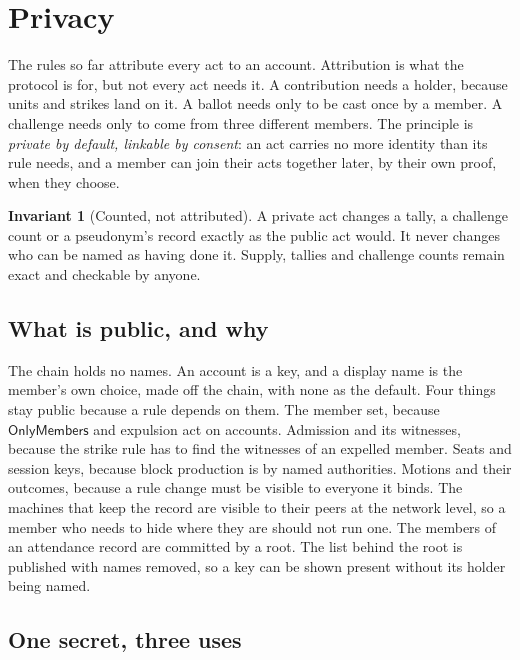 \documentclass[11pt,a4paper]{article}
\theoremstyle{definition}
\newtheorem{invariant}{Invariant}[section]
\theoremstyle{plain}
\theoremstyle{remark}
\begin{document}
\section{Privacy}
\label{sec:privacy}

The rules so far attribute every act to an account. Attribution is what the protocol is for, but not every act needs it. A contribution needs a holder, because units and strikes land on it. A ballot needs only to be cast once by a member. A challenge needs only to come from three different members. The principle is \emph{private by default, linkable by consent}: an act carries no more identity than its rule needs, and a member can join their acts together later, by their own proof, when they choose.

\begin{invariant}[Counted, not attributed]
\label{inv:counted}
A private act changes a tally, a challenge count or a pseudonym's record exactly as the public act would. It never changes who can be named as having done it. Supply, tallies and challenge counts remain exact and checkable by anyone.
\end{invariant}

\subsection{What is public, and why}

The chain holds no names. An account is a key, and a display name is the member's own choice, made off the chain, with none as the default. Four things stay public because a rule depends on them. The member set, because $\mathsf{OnlyMembers}$ and expulsion act on accounts. Admission and its witnesses, because the strike rule has to find the witnesses of an expelled member. Seats and session keys, because block production is by named authorities. Motions and their outcomes, because a rule change must be visible to everyone it binds. The machines that keep the record are visible to their peers at the network level, so a member who needs to hide where they are should not run one. The members of an attendance record are committed by a root. The list behind the root is published with names removed, so a key can be shown present without its holder being named.

\subsection{One secret, three uses}
\end{document}
